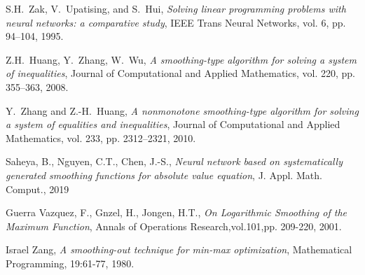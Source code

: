\documentclass[12pt]{article}
\begin{document}
\begin{thebibliography}{1}
 {\sc S.H.\ Zak, V.\ Upatising, and S.\ Hui},
 {\em Solving linear programming problems with neural networks: a comparative study},
 IEEE Trans Neural Networks, vol. 6, pp. 94--104, 1995.


%
%

 {\sc Z.H.\ Huang, Y.\ Zhang, W.\ Wu},
 {\em A smoothing-type algorithm for solving a system of inequalities},
 Journal of Computational and Applied Mathematics, vol. 220, pp. 355--363, 2008.


 {\sc Y.\ Zhang and Z.-H.\ Huang},
 {\em A nonmonotone smoothing-type algorithm for solving a system of equalities and inequalities},
 Journal of Computational and Applied Mathematics, vol. 233, pp. 2312--2321, 2010.

  {\sc Saheya, B., Nguyen, C.T., Chen, J.-S.},
   {\em Neural network based on systematically generated smoothing functions for absolute value equation},
    J. Appl. Math. Comput., 2019

 {\sc Guerra Vazquez, F., Gnzel, H., Jongen, H.T.},
 {\em  On Logarithmic Smoothing of the Maximum Function},
 Annals of Operations Research,vol.101,pp. 209-220, 2001.

 {\sc Israel Zang},
 {\em A smoothing-out technique for min-max optimization},
  Mathematical Programming, 19:61-77, 1980.

 \end{thebibliography}


 
\end{document}
